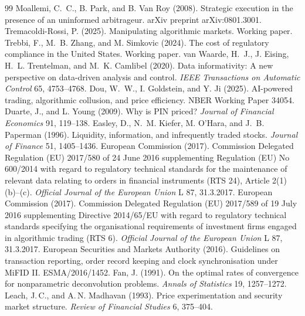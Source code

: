 \documentclass[12pt]{article}
\theoremstyle{definition}
\theoremstyle{remark}
\begin{document}
\begin{thebibliography}{99}
 Moallemi, C.~C., B. Park, and B. Van Roy (2008). Strategic execution in the presence of an uninformed arbitrageur. arXiv preprint arXiv:0801.3001.
 Tremacoldi-Rossi, P. (2025). Manipulating algorithmic markets. Working paper.
 Trebbi, F., M.~B. Zhang, and M. Simkovic (2024). The cost of regulatory compliance in the United States. Working paper.
 van Waarde, H.~J., J. Eising, H.~L. Trentelman, and M.~K. Camlibel (2020). Data informativity: A new perspective on data-driven analysis and control. \emph{IEEE Transactions on Automatic Control} 65, 4753--4768.
 Dou, W.~W., I. Goldstein, and Y. Ji (2025). AI-powered trading, algorithmic collusion, and price efficiency. NBER Working Paper 34054.
 Duarte, J., and L. Young (2009). Why is PIN priced? \emph{Journal of Financial Economics} 91, 119--138.
 Easley, D., N.~M. Kiefer, M. O'Hara, and J.~B. Paperman (1996). Liquidity, information, and infrequently traded stocks. \emph{Journal of Finance} 51, 1405--1436.
 European Commission (2017). Commission Delegated Regulation (EU) 2017/580 of 24 June 2016 supplementing Regulation (EU) No 600/2014 with regard to regulatory technical standards for the maintenance of relevant data relating to orders in financial instruments (RTS 24), Article 2(1)(b)--(c). \emph{Official Journal of the European Union} L 87, 31.3.2017.
 European Commission (2017). Commission Delegated Regulation (EU) 2017/589 of 19 July 2016 supplementing Directive 2014/65/EU with regard to regulatory technical standards specifying the organisational requirements of investment firms engaged in algorithmic trading (RTS 6). \emph{Official Journal of the European Union} L 87, 31.3.2017.
 European Securities and Markets Authority (2016). Guidelines on transaction reporting, order record keeping and clock synchronisation under MiFID II. ESMA/2016/1452.
 Fan, J. (1991). On the optimal rates of convergence for nonparametric deconvolution problems. \emph{Annals of Statistics} 19, 1257--1272.
 Leach, J.\,C., and A.\,N. Madhavan (1993). Price experimentation and security market structure. \emph{Review of Financial Studies} 6, 375--404.


\end{thebibliography}
\end{document}

